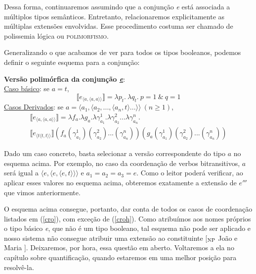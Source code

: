 Dessa forma, continuaremos assumindo que a conjun\-ção \textit{e} está associada a
múltiplos tipos semânticos. Entretanto, relacionaremos explicitamente as múltiplas extensões envolvidas. Esse procedimento costuma ser chamado de polissemia lógica ou \textsc{polimorfismo}.

Generalizando o que acabamos de ver para todos os tipos booleanos, podemos definir o seguinte esquema para a conjunção:\\

\begin{tcolorbox}[boxrule=0pt,sharp corners]
	
	\textbf{Versão polimórfica da conjun\-ção \underline{\textit{e}}}:\\
	
	\underline{Caso básico}: se $a = t$,
	\begin{equation*}
	\llbracket e_{\langle a ,\langle a,a\rangle\rangle}\rrbracket = \lambda p_{t}.\ \lambda q_{t}.\ p=1\ \&\ q=1 
	\end{equation*}
	\underline{Casos Derivados}: se $a = \langle a_{1},\langle a_{2}, ... ,\langle a_{n},t\rangle ... \rangle\rangle\ (n\geq 1)$,
	\begin{multline*}
	\llbracket e_{\langle a ,\langle a,a\rangle\rangle}\rrbracket = \lambda f_{a}.\lambda g_{a}.\lambda \gamma_{a_{1}}^{1}.\lambda \gamma_{a_{2}}^{2}...\lambda \gamma_{a_{n}}^{n}.\\ \llbracket e_{\langle t\langle t,t\rangle\rangle}\rrbracket(f_{a}(\gamma_{a_{1}}^{1})(\gamma_{a_{2}}^{2})...(\gamma_{a_{n}}^{n}))(g_{a}(\gamma_{a_{1}}^{1})(\gamma_{a_{2}}^{2})...(\gamma_{a_{n}}^{n}))
	\end{multline*}
	
\end{tcolorbox}

\bigskip


\n Dado um caso concreto, basta selecionar a versão correspondente do tipo $a$ no esquema acima. Por exemplo, no caso da coordenação de verbos bitransitivos, $a$ será igual a $\langle e, \langle e, \langle e,t\rangle\rangle\rangle$ e $a_{1}=a_{2}=a_{3}=e$. Como o leitor poderá verificar, ao aplicar esses valores no esquema acima, obteremos exatamente a extensão de $e'''$ que vimos anteriormente.
    
O esquema acima consegue, portanto, dar conta de
todos os casos de coordena\-ção listados em (\ref{cro}), com
exce\-ção de (\ref{croh}). Como atribuímos aos nomes próprios o
tipo básico \textit{e}, que não é um tipo booleano, tal esquema não pode ser aplicado e nosso sistema não
consegue atribuir uma extensão ao constituinte [$_{\text{\textsc{NP}}}$ João e Maria ]. Deixaremos, por hora, essa
questão em aberto. Voltaremos a ela no capítulo sobre
quantifica\-ção, quando estaremos em uma melhor posi\-ção para
resolvê-la.\\

